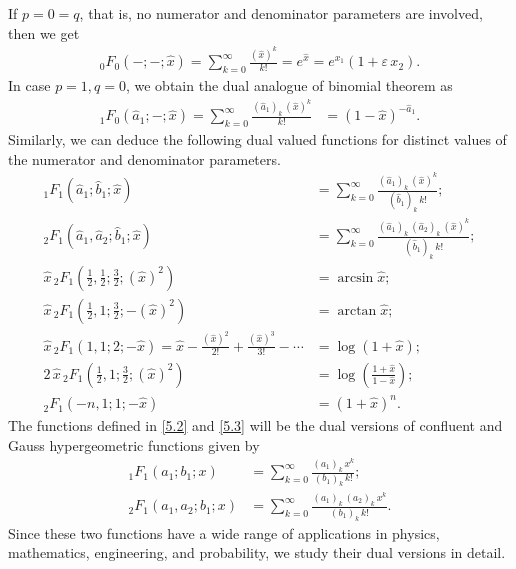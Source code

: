 \documentclass[11pt,a4paper,fleqn]{article}
\numberwithin{equation}{section}
\numberwithin{lemma}{section}
\numberwithin{theorem}{section}
\numberwithin{corollary}{section}
\begin{document}
If $p = 0 = q$,  that is, no numerator and denominator parameters are involved, then we get
\begin{align*}
{}_0F_0 (-; -;  \widehat{x}) = \sum_{k = 0}^{\infty} \frac{(\widehat{x})^k}{k !} = e^{\widehat{x}} = e^{x_1} (1 + \varepsilon \, x_2). 
\end{align*}
In case $p = 1, q = 0$, we obtain the dual analogue of binomial theorem as 
\begin{align}
{}_1F_0 (\widehat{a}_1; -;  \widehat{x})  = \sum_{k = 0}^{\infty} \frac{(\widehat{a}_1)_k \, (\widehat{x})^k}{k !} & = (1 - \widehat{x})^{-\widehat{a}_1}. \label{5.1}
\end{align}
Similarly, we can deduce the following dual valued functions for distinct values of the numerator and denominator parameters. 
\begin{align}
	{}_1F_1 (\widehat{a}_1; \widehat{b}_1;  \widehat{x}) & = \sum_{k = 0}^{\infty} \frac{(\widehat{a}_1)_k \, (\widehat{x})^k}{(\widehat{b}_1)_k \, k !};\label{5.2}
\\[5pt]
	{}_2F_1 (\widehat{a}_1, \widehat{a}_2; \widehat{b}_1;  \widehat{x}) & = \sum_{k = 0}^{\infty} \frac{(\widehat{a}_1)_k \, (\widehat{a}_2)_k \, (\widehat{x})^k}{(\widehat{b}_1)_k \, k !};\label{5.3}
\\[5pt]
	\widehat{x} \, {}_2F_1 \left(\frac{1}{2}, \frac{1}{2}; \frac{3}{2};  (\widehat{x})^2\right) & = \arcsin \widehat{x};
\\[5pt]
	\widehat{x} \, {}_2F_1 \left(\frac{1}{2}, 1; \frac{3}{2};  -(\widehat{x})^2\right) & = \arctan \widehat{x};
\\[5pt]
	\widehat{x} \, {}_2F_1 \left(1, 1; 2;  - \widehat{x} \right) = \widehat{x} - \frac{(\widehat{x})^2}{2!} + \frac{(\widehat{x})^3}{3!} - \cdots & = \log (1 + \widehat{x});
\\[5pt]
	2 \, \widehat{x} \, {}_2F_1 \left(\frac{1}{2}, 1; \frac{3}{2};  (\widehat{x})^2\right) & = \log \left(\frac{1 + \widehat{x}}{1 - \widehat{x}}\right);
\\[5pt]
{}_2F_1 \left(-n, 1; 1;  - \widehat{x} \right) & =  (1 + \widehat{x})^n.
\end{align}
The functions defined in \eqref{5.2} and \eqref{5.3} will be the dual versions of confluent and Gauss hypergeometric functions given by
\begin{align}
	{}_1F_1 ( {a}_1;  {b}_1;   {x}) & = \sum_{k = 0}^{\infty} \frac{({a}_1)_k \,  {x}^k}{({b}_1)_k \, k !};
\\[5pt]
{}_2F_1 ({a}_1, {a}_2;  {b}_1;   {x}) & = \sum_{k = 0}^{\infty} \frac{({a}_1)_k \, ({a}_2)_k \, {x}^k}{({b}_1)_k \, k !}.
\end{align}
Since these two functions have a wide range of applications in physics, mathematics, engineering, and probability, we study their dual versions in detail. 
\end{document}
